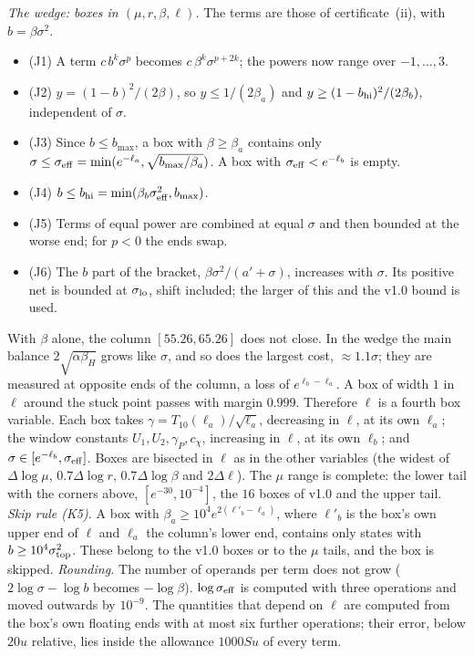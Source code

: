 \emph{The wedge: boxes in $(\mu,r,\beta,\ell)$.}
The terms are those of certificate~(ii), with $b=\beta\sigma^2$.
\begin{itemize}
\item (J1) A term $c\,b^k\sigma^p$ becomes $c\,\beta^k\sigma^{p+2k}$; the powers now range over $-1,\dots,3$.
\item (J2) $y=(1-b)^2/(2\beta)$, so $y\le1/(2\beta_a)$ and $y\ge(1-b_{\rm hi})^2/(2\beta_b)$, independent of $\sigma$.
\item (J3) Since $b\le b_{\max}$, a box with $\beta\ge\beta_a$ contains only $\sigma\le\sigma_{\rm eff}=\min(e^{-\ell_a},\sqrt{b_{\max}/\beta_a})$.
  A box with $\sigma_{\rm eff}<e^{-\ell_b}$ is empty.
\item (J4) $b\le b_{\rm hi}=\min(\beta_b\sigma_{\rm eff}^2,b_{\max})$.
\item (J5) Terms of equal power are combined at equal $\sigma$ and then bounded at the worse end; for $p<0$ the ends swap.
\item (J6) The $b$ part of the bracket, $\beta\sigma^2/(a'+\sigma)$, increases with $\sigma$.
  Its positive net is bounded at $\sigma_{\rm lo}$, shift included; the larger of this and the v1.0 bound is used.
\end{itemize}
With $\beta$ alone, the column $[55.26,65.26]$ does not close.
In the wedge the main balance $2\sqrt{\alpha\beta_H}$ grows like $\sigma$, and so does the largest cost, $\approx1.1\sigma$; they are measured at opposite ends of the column, a loss of $e^{\ell_b-\ell_a}$.
A box of width $1$ in $\ell$ around the stuck point passes with margin $0.999$.
Therefore $\ell$ is a fourth box variable.
Each box takes $\gamma=T_{10}(\ell_a)/\sqrt{\ell_a}$, decreasing in $\ell$, at its own $\ell_a$; the window constants $U_1,U_2,\gamma_P,c_\chi$, increasing in $\ell$, at its own $\ell_b$; and $\sigma\in[e^{-\ell_b},\sigma_{\rm eff}]$.
Boxes are bisected in $\ell$ as in the other variables (the widest of $\Delta\log\mu$, $0.7\Delta\log r$, $0.7\Delta\log\beta$ and $2\Delta\ell$).
The $\mu$ range is complete: the lower tail with the corners above, $[e^{-30},10^{-4}]$, the $16$ boxes of v1.0 and the upper tail.
\emph{Skip rule (K5).}
A box with $\beta_a\ge10^4e^{2(\ell'_b-\ell_a)}$, where $\ell'_b$ is the box's own upper end of $\ell$ and $\ell_a$ the column's lower end, contains only states with $b\ge10^4\sigma_{\rm top}^2$.
These belong to the v1.0 boxes or to the $\mu$ tails, and the box is skipped.
\emph{Rounding.}
The number of operands per term does not grow ($2\log\sigma-\log b$ becomes $-\log\beta$).
$\log\sigma_{\rm eff}$ is computed with three operations and moved outwards by $10^{-9}$.
The quantities that depend on $\ell$ are computed from the box's own floating ends with at most six further operations; their error, below $20u$ relative, lies inside the allowance $1000Su$ of every term.

